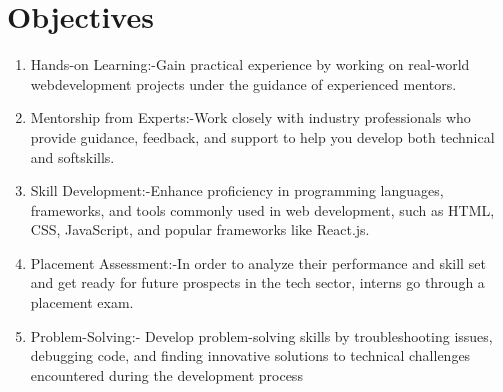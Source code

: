 \section{Objectives}
\begin{enumerate}
\item Hands-on Learning:-Gain practical experience by working on real-world webdevelopment projects under the guidance of experienced mentors.\smallskip
\item Mentorship from Experts:-Work closely with industry professionals who provide guidance, feedback, and support to help you develop both technical and softskills.\smallskip
\item Skill Development:-Enhance proficiency in programming languages, frameworks, and tools commonly used in web development, such as HTML, CSS, JavaScript, and popular frameworks like React.js.\smallskip
\item Placement Assessment:-In order to analyze their performance and skill set and get ready for future prospects in the tech sector, interns go through a placement exam.\smallskip
\item  Problem-Solving:- Develop problem-solving skills by troubleshooting issues, debugging code, and finding innovative solutions to technical challenges encountered during the development process
\end{enumerate}

	
